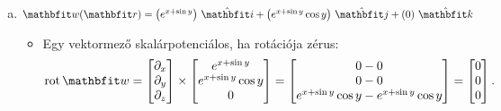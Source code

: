 \documentclass[exercise]{math-standalone}
\begin{document}
\begin{exercise}
{\begin{enumerate}[a)]
\begin{itemize}
                    A keresett vektorpotenciál:
                    \[
                      \rvec V(\rvec r)
                      =
                      \ijk{xz + \frac{z^2}{2}}
                      {\frac{x^2}{2} + xy - \frac{z^2}{2} - yz}
                      {0}
                      \text.
                    \]
            \end{itemize}

      \item $\rvec w(\rvec r) = \ijk{e^{x + \sin y}}{e^{x + \sin y} \cos y}{0}$
            \begin{itemize}
              \item Egy vektormező skalárpotenciálos, ha rotációja zérus:
                    \[
                      \rot \rvec w
                      =
                      \begin{bmatrix}
                        \partial_x \\ \partial_y \\ \partial_z
                      \end{bmatrix}
                      \times
                      \begin{bmatrix}
                        e^{x + \sin y} \\ e^{x + \sin y} \cos y \\ 0
                      \end{bmatrix}
                      =
                      \begin{bmatrix}
                        0 - 0 \\ 0 - 0 \\ e^{x + \sin y} \cos y - e^{x + \sin y} \cos y
                      \end{bmatrix}
                      =
                      \begin{bmatrix}
                        0 \\ 0 \\ 0
                      \end{bmatrix}
                      \text.
                    \]


\end{itemize}
\end{enumerate}}
\end{exercise}
\end{document}
